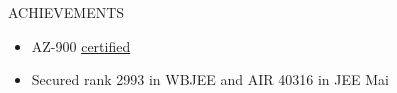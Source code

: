 \documentclass{resume} %
\begin{document}
\begin{rSection}{ACHIEVEMENTS} 
\begin{itemize}
    \item 	AZ-900 \href{https://learn.microsoft.com/api/credentials/share/en-in/arkapratimghosh-4932/AB85DDF780F0F7DA?sharingId=EEAD82A39A0C4FAC}{certified}
    \item	Secured rank 2993 in WBJEE and AIR 40316 in JEE Mai
\end{itemize}


\end{rSection}

\end{document}
